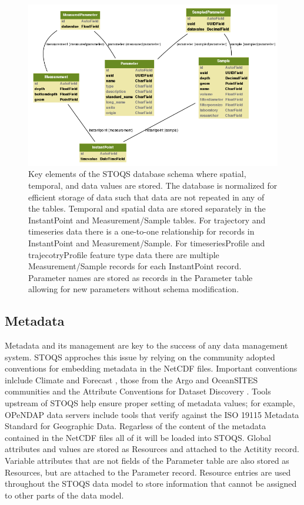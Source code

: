 \documentclass[conference]{IEEEtran}
\begin{document}
\begin{figure}[htbp]
\centering
\includegraphics[scale=0.5]{stoqs_simple_model.png}
\caption{Key elements of the STOQS database schema where spatial, temporal, and data values are stored. The database is normalized for efficient storage of data such that data are not repeated in any of the tables. Temporal and spatial data are stored separately in the InstantPoint and Measurement/Sample tables. For trajectory and timeseries data there is a one-to-one relationship for records in InstantPoint and Measurement/Sample. For timeseriesProfile and trajecotryProfile feature type data there are multiple Measurement/Sample records for each InstantPoint record. Parameter names are stored as records in the Parameter table allowing for new parameters without schema modification.}
\label{fig:stoqs_simple_model}
\end{figure}

\subsection{Metadata}

Metadata and its management are key to the success of any data management system. STOQS approches this issue by relying on the community adopted conventions for embedding metadata in the NetCDF files. Important conventions inlclude Climate and Forecast \cite{CF}, those from the Argo and OceanSITES communities \cite{Pouliquen2006} and the Attribute Conventions for Dataset Discovery \cite{ACDD}. Tools upstream of STOQS help ensure proper setting of metadata values; for example, OPeNDAP data servers include tools that verify against the ISO 19115 Metadata Standard for Geographic Data. Regarless of the content of the metadata contained in the NetCDF files all of it will be loaded into STOQS. Global attributes and values are stored as Resources and attached to the Actitity record. Variable attributes that are not fields of the Parameter table are also stored as Resources, but are attached to the Parameter record. Resource entries are used throughout the STOQS data model to store information that cannot be assigned to other parts of the data model.
\end{document}
